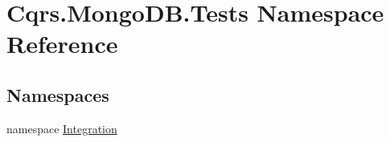 \hypertarget{namespaceCqrs_1_1MongoDB_1_1Tests}{}\section{Cqrs.\+Mongo\+D\+B.\+Tests Namespace Reference}
\label{namespaceCqrs_1_1MongoDB_1_1Tests}
\subsection*{Namespaces}
\begin{DoxyCompactItemize}
\item 
namespace \hyperlink{namespaceCqrs_1_1MongoDB_1_1Tests_1_1Integration}{Integration}
\end{DoxyCompactItemize}
